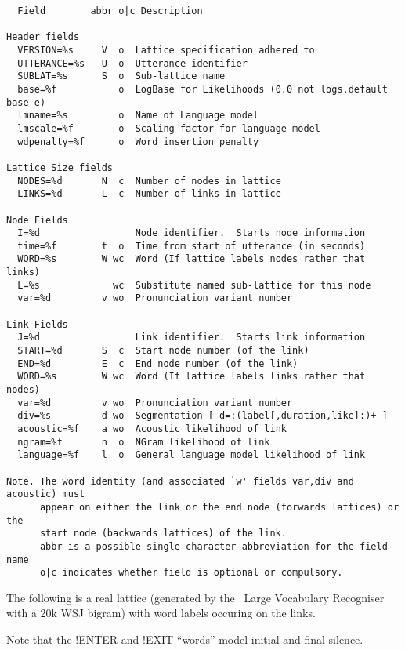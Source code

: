 \begin{verbatim}
  Field        abbr o|c Description

Header fields
  VERSION=%s     V  o  Lattice specification adhered to
  UTTERANCE=%s   U  o  Utterance identifier
  SUBLAT=%s      S  o  Sub-lattice name
  base=%f           o  LogBase for Likelihoods (0.0 not logs,default base e)
  lmname=%s         o  Name of Language model
  lmscale=%f        o  Scaling factor for language model
  wdpenalty=%f      o  Word insertion penalty

Lattice Size fields
  NODES=%d       N  c  Number of nodes in lattice
  LINKS=%d       L  c  Number of links in lattice

Node Fields
  I=%d                 Node identifier.  Starts node information
  time=%f        t  o  Time from start of utterance (in seconds)
  WORD=%s        W wc  Word (If lattice labels nodes rather that links)
  L=%s             wc  Substitute named sub-lattice for this node
  var=%d         v wo  Pronunciation variant number

Link Fields
  J=%d                 Link identifier.  Starts link information
  START=%d       S  c  Start node number (of the link)
  END=%d         E  c  End node number (of the link)
  WORD=%s        W wc  Word (If lattice labels links rather that nodes)
  var=%d         v wo  Pronunciation variant number
  div=%s         d wo  Segmentation [ d=:(label[,duration,like]:)+ ]
  acoustic=%f    a wo  Acoustic likelihood of link
  ngram=%f       n  o  NGram likelihood of link
  language=%f    l  o  General language model likelihood of link

Note. The word identity (and associated `w' fields var,div and acoustic) must
      appear on either the link or the end node (forwards lattices) or the 
      start node (backwards lattices) of the link.
      abbr is a possible single character abbreviation for the field name
      o|c indicates whether field is optional or compulsory.

\end{verbatim}


The following is a real lattice (generated by the \HTK\ Large Vocabulary
Recogniser with a 20k WSJ bigram) with 
word labels occuring on the links.

Note that the !ENTER and !EXIT ``words'' model initial and
final silence.  


